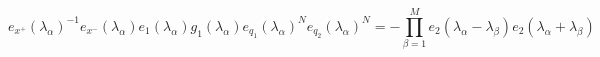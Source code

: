 \begin{equation}
e_{x^{+}}(\lambda_{\alpha})^{-1}e_{x^{-}}(\lambda_{\alpha})e_{1}(\lambda_{\alpha})
g_{1}(\lambda_{\alpha})e_{q_{1}}(\lambda_{\alpha})^{N}e_{q_{2}}(\lambda_{\alpha})^{N}
= -\prod_{\beta=1}^{M} e_2(\lambda_{\alpha}-\lambda_{\beta})
e_2(\lambda_{\alpha}+\lambda_{\beta}) \label{BEO}
\end{equation}

